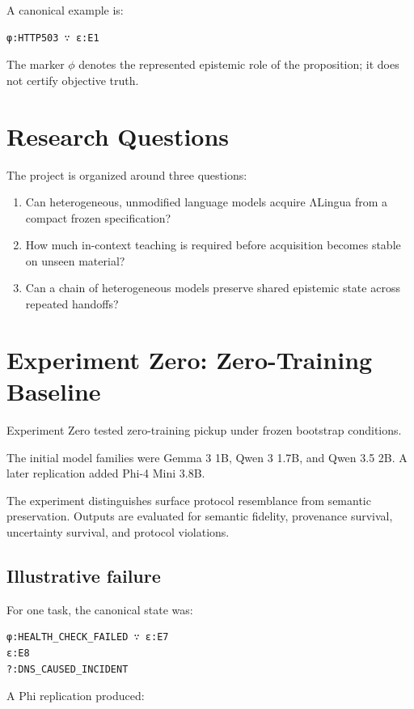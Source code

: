 \documentclass[11pt]{article}
\begin{document}
A canonical example is:

\begin{verbatim}
φ:HTTP503 ∵ ε:E1
\end{verbatim}

The marker $\phi$ denotes the represented epistemic role of the proposition; it does not certify objective truth.

\section{Research Questions}

The project is organized around three questions:

\begin{enumerate}
  \item Can heterogeneous, unmodified language models acquire ΛLingua from a compact frozen specification?
  \item How much in-context teaching is required before acquisition becomes stable on unseen material?
  \item Can a chain of heterogeneous models preserve shared epistemic state across repeated handoffs?
\end{enumerate}

\section{Experiment Zero: Zero-Training Baseline}

Experiment Zero tested zero-training pickup under frozen bootstrap conditions.

The initial model families were Gemma 3 1B, Qwen 3 1.7B, and Qwen 3.5 2B. A later replication added Phi-4 Mini 3.8B.

The experiment distinguishes surface protocol resemblance from semantic preservation. Outputs are evaluated for semantic fidelity, provenance survival, uncertainty survival, and protocol violations.

\subsection{Illustrative failure}

For one task, the canonical state was:

\begin{verbatim}
φ:HEALTH_CHECK_FAILED ∵ ε:E7
ε:E8
?:DNS_CAUSED_INCIDENT
\end{verbatim}

A Phi replication produced:
\end{document}
